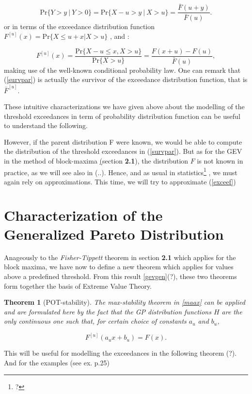 \documentclass[11pt,a4paper,openany ]{book}
\newtheorem{theorem}{Theorem}[chapter]
\begin{document}
\begin{equation}\label{survpar}
\text{Pr}\big\{Y>y\ |\ Y>0\big\}=\text{Pr}\big\{X-u>y\ |\ X>u\big\}=\frac{\bar{F}(u+y)}{\bar{F}(u)}.
\end{equation}
or in terms of the exceedance distribution function $F^{[u]}(x)=\text{Pr}\{X\leq u+x|X>u\}$
\cite[pp.12]{reiss_statistical_2007}, \cite{charras_extreme_2013} and \cite{rosso_extreme_2015} :

\begin{equation}\label{exceef}
F^{[u]}(x)=\frac{\text{Pr}\{X-u\leq 
x,X>u\}}{\text{Pr}\{X>u\}}=\frac{F(x+u)-F(u)}{\bar{F}(u)},
\end{equation}
making use of the well-known conditional probability law. One can remark that (\ref{survpar}) is actually the survivor of the exceedance distribution function, that is $\bar{F}^{[u]}$.

These intuitive characterizations we have given above about the modelling of the threshold exceedances in term of probability distribution function can be useful to understand the following. 

However, if the parent distribution F were known, we would be able to compute the distribution of the threshold exceedances in (\ref{survpar}). \cite[pp.74]{coles_introduction_2001} But as for the GEV in the method of block-maxima \hyperref[](section \textbf{2.1}), the distribution $F$ is not known in practice, as we will see also in (..). Hence, and as usual in statistics\footnote{?}%
, we must again rely on approximations. This time, we will try to approximate (\ref{exceef})

\section{Characterization of the Generalized Pareto Distribution}

Anageously to the \emph{Fisher-Tippett} theorem in section \textbf{2.1} which applies for the block maxima, we have now to define a new theorem which applies for values above a predefined threshold. From this result \ref{gevgen}(?), these two theorems form together the basis of Extreme Value Theory.

\begin{theorem}[POT-stability]\emph{\citet[pp.25]{reiss_statistical_2007}} The max-stability theorem in \ref{maax} can be applied and are formulated here by the fact that the GP distribution functions $H$ are the only continuous one such that, for certain choice of constants $a_u$ and $b_u$, 
	
	\begin{equation*}
	F^{[u]}(a_ux+b_u)=F(x).
	\end{equation*}
\end{theorem}
This will be useful for modelling the exceedances in the following theorem (?). And for the examples (see ex. p.25)
\end{document}

